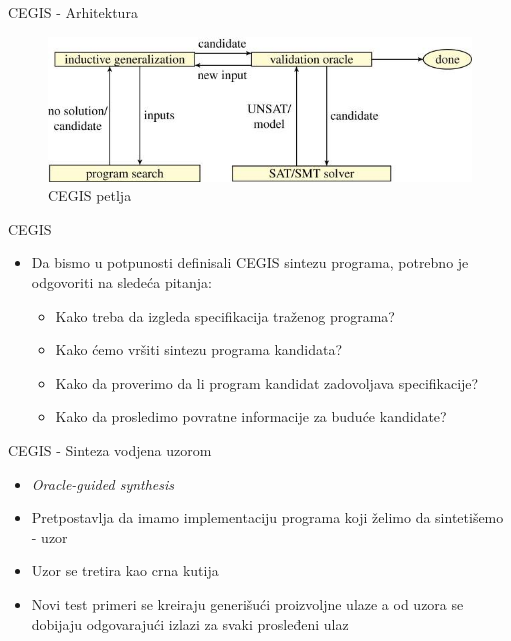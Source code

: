 \documentclass{beamer}
\begin{document}
\begin{frame}[fragile]{CEGIS - Arhitektura}
    \begin{figure}
        \begin{center}
            \includegraphics[scale=0.4]{../resources/cegis.jpeg}
        \end{center}
        \caption{CEGIS petlja}
    \end{figure}
\end{frame}

\begin{frame}{CEGIS}
    \begin{itemize}
        \item Da bismo u potpunosti definisali CEGIS sintezu programa, potrebno je odgovoriti na sledeća pitanja:
        \begin{itemize}
            \item Kako treba da izgleda specifikacija traženog programa?
            \item Kako ćemo vršiti sintezu programa kandidata?
            \item Kako da proverimo da li program kandidat zadovoljava specifikacije?
            \item Kako da prosledimo povratne informacije za buduće kandidate?
        \end{itemize}
    \end{itemize}
\end{frame}

\begin{frame}{CEGIS - Sinteza vodjena uzorom}
    \begin{itemize}
        \item \emph{Oracle-guided synthesis}
        \item Pretpostavlja da imamo implementaciju programa koji želimo da sintetišemo - uzor
        \item Uzor se tretira kao crna kutija
        \item Novi test primeri se kreiraju generišući proizvoljne ulaze a od uzora se dobijaju odgovarajući izlazi za svaki prosleđeni ulaz
    \end{itemize}
\end{frame}
\end{document}
